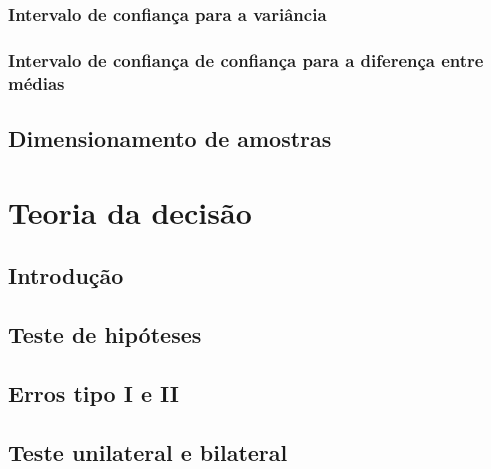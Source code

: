 \documentclass[
]{book}
\begin{document}
\hypertarget{intervalo-de-confianuxe7a-para-a-variuxe2ncia}{%
\subsection{Intervalo de confiança para a variância}\label{intervalo-de-confianuxe7a-para-a-variuxe2ncia}}

\hypertarget{intervalo-de-confianuxe7a-de-confianuxe7a-para-a-diferenuxe7a-entre-muxe9dias}{%
\subsection{Intervalo de confiança de confiança para a diferença entre médias}\label{intervalo-de-confianuxe7a-de-confianuxe7a-para-a-diferenuxe7a-entre-muxe9dias}}

\hypertarget{dimensionamento-de-amostras}{%
\section{Dimensionamento de amostras}\label{dimensionamento-de-amostras}}

\hypertarget{chap:teodec}{%
\chapter{Teoria da decisão}\label{chap:teodec}}

\hypertarget{introduuxe7uxe3o-7}{%
\section{Introdução}\label{introduuxe7uxe3o-7}}

\hypertarget{teste-de-hipuxf3teses}{%
\section{Teste de hipóteses}\label{teste-de-hipuxf3teses}}

\hypertarget{erros-tipo-i-e-ii}{%
\section{Erros tipo I e II}\label{erros-tipo-i-e-ii}}

\hypertarget{teste-unilateral-e-bilateral}{%
\section{Teste unilateral e bilateral}\label{teste-unilateral-e-bilateral}}
\end{document}

